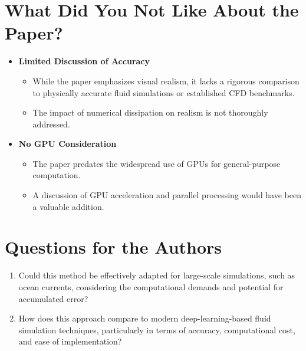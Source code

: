 \documentclass[12pt]{article}
\begin{document}
\section{What Did You Not Like About the Paper?}
\begin{itemize}[noitemsep]
    \item \textbf{Limited Discussion of Accuracy}
    \begin{itemize}[noitemsep]
        \item While the paper emphasizes visual realism, it lacks a rigorous comparison to physically accurate fluid simulations or established CFD benchmarks.
        \item The impact of numerical dissipation on realism is not thoroughly addressed.
    \end{itemize}
    \item \textbf{No GPU Consideration}
    \begin{itemize}[noitemsep]
        \item The paper predates the widespread use of GPUs for general-purpose computation.
        \item A discussion of GPU acceleration and parallel processing would have been a valuable addition.
    \end{itemize}
\end{itemize}

\section{Questions for the Authors}
\begin{enumerate}[noitemsep]
    \item Could this method be effectively adapted for large-scale simulations, such as ocean currents, considering the computational demands and potential for accumulated error?
    \item How does this approach compare to modern deep-learning-based fluid simulation techniques, particularly in terms of accuracy, computational cost, and ease of implementation?
\end{enumerate}
\end{document}
